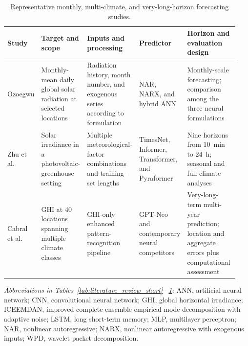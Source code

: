 \begin{table}[!t]
\centering
\caption{Representative monthly, multi-climate, and very-long-horizon
forecasting studies.}
\label{tab:literature_review_long}
\scriptsize
\setlength{\tabcolsep}{2.5pt}
\renewcommand{\arraystretch}{1.12}
\begin{tabular}{@{}p{0.11\linewidth}p{0.18\linewidth}p{0.22\linewidth}p{0.18\linewidth}p{0.25\linewidth}@{}}
\toprule
\textbf{Study} & \textbf{Target and scope} & \textbf{Inputs and processing} &
\textbf{Predictor} & \textbf{Horizon and evaluation design} \\
\midrule
Ozoegwu \cite{ozoegwu2019} &
Monthly-mean daily global solar radiation at selected locations &
Radiation history, month number, and exogenous series according to formulation &
NAR, NARX, and hybrid ANN &
Monthly-scale forecasting; comparison among the three neural formulations \\

Zhu et al.\ \cite{zhu2024} &
Solar irradiance in a photovoltaic-greenhouse setting &
Multiple meteorological-factor combinations and training-set lengths &
TimesNet, Informer, Transformer, and Pyraformer &
Nine horizons from 10~min to 24~h; seasonal and full-climate analyses \\

Cabral et al.\ \cite{cabral2026} &
GHI at 40 locations spanning multiple climate classes &
GHI-only enhanced pattern-recognition pipeline &
GPT-Neo and contemporary neural competitors &
Very-long-term multi-year prediction; location and aggregate errors plus computational assessment \\
\bottomrule
\end{tabular}
\par\medskip
\begin{minipage}{0.96\linewidth}
\scriptsize
\textit{Abbreviations in Tables~\ref{tab:literature_review_short}--%
\ref{tab:literature_review_long}:} ANN, artificial neural network; CNN,
convolutional neural network; GHI, global horizontal irradiance; ICEEMDAN,
improved complete ensemble empirical mode decomposition with adaptive noise;
LSTM, long short-term memory; MLP, multilayer perceptron; NAR, nonlinear
autoregressive; NARX, nonlinear autoregressive with exogenous inputs; WPD,
wavelet packet decomposition.
\end{minipage}
\end{table}
